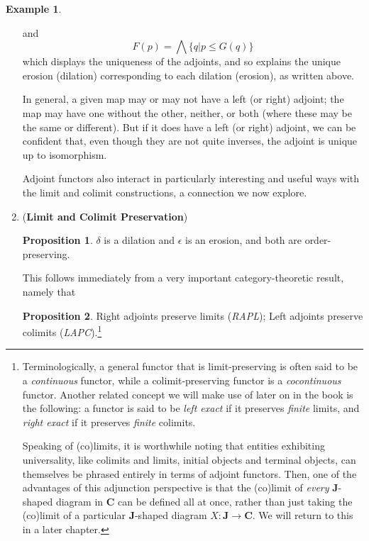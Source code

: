 \documentclass[a4paper]{book}
\theoremstyle{definition}
\newtheorem{example}{Example}[section]
\theoremstyle{definition}
\theoremstyle{definition}
\newtheorem{proposition}{Proposition}[section]
\theoremstyle{theorem}
\theoremstyle{definition}
\begin{document}
\begin{example}
\begin{enumerate}
and 
\begin{equation*}
F(p) = \bigwedge \{q | p \leq G(q)\}
\end{equation*}
which displays the uniqueness of the adjoints, and so explains the unique erosion (dilation) corresponding to each dilation (erosion), as written above. \par 
In general, a given map may or may not have a left (or right) adjoint; the map may have one without the other, neither, or both (where these may be the same or different). But if it does have a left (or right) adjoint, we can be confident that, even though they are not quite inverses, the adjoint is unique up to isomorphism. \par 
Adjoint functors also interact in particularly interesting and useful ways with the limit and colimit constructions, a connection we now explore. \par 
	\item (\textbf{Limit and Colimit Preservation}) 
	\begin{proposition} $\delta$ is a dilation and $\epsilon$ is an erosion, and both are order-preserving. 
	\end{proposition} 
This follows immediately from a very important category-theoretic result, namely that 
	\begin{proposition}
		Right adjoints preserve limits (\textit{RAPL}); Left adjoints preserve colimits (\textit{LAPC}).\footnote{Terminologically, a general functor that is limit-preserving is often said to be a \textit{continuous} functor, while a colimit-preserving functor is a \textit{cocontinuous} functor. Another related concept we will make use of later on in the book is the following: a functor is said to be \textit{left exact} if it preserves \textit{finite} limits, and \textit{right exact} if it preserves \textit{finite} colimits.\par 
		Speaking of (co)limits, it is worthwhile noting that entities exhibiting universality, like colimits and limits, initial objects and terminal objects, can themselves be phrased entirely in terms of adjoint functors. Then, one of the advantages of this adjunction perspective is that the (co)limit of \textit{every} \textbf{J}-shaped diagram in $\textbf{C}$ can be defined all at once, rather than just taking the (co)limit of a particular $\textbf{J}$-shaped diagram $X: \textbf{J} \rightarrow \textbf{C}$. We will return to this in a later chapter.} 
	\end{proposition} 

\end{enumerate}
\end{example}
\end{document}
